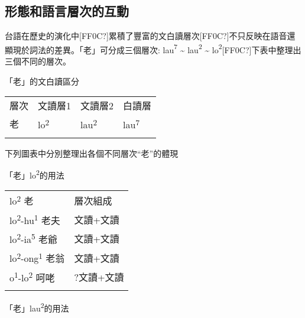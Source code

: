 \subsection{ 形態和語言層次的互動}

\textrm{台語在歷史的演化中[FF0C?]累積了豐富的文白讀層次[FF0C?]不只反映在語音還顯現於詞法的差異。「老」可分成三個層次: lau}\textrm{\textsuperscript{7}} \textrm{{\textasciitilde} lau}\textrm{\textsuperscript{2}} \textrm{{\textasciitilde} lo}\textrm{\textsuperscript{2}}[FF0C?]\textrm{下表中整理出三個不同的層次。}

 \textrm{「老」}的文白讀區分

\tablefirsthead{}

\tabletail{}
\tablelasttail{}
\begin{tabularx}{\textwidth}{XXXX}
\lsptoprule

 層次 & 文讀層1 & 文讀層2 & 白讀層\\
 老 & {\sffamily \textrm{lo}\textrm{\textsuperscript{2}}} & {\sffamily \textrm{lau}\textrm{\textsuperscript{2}}} & {\sffamily \textrm{lau}\textrm{\textsuperscript{7}}}\\
\lspbottomrule
\end{tabularx}
\rmfamily
下列圖表中分別整理出各個不同層次“老”的體現

 \textrm{「老」lo}\textrm{\textsuperscript{2}}的用法

\tablefirsthead{}

\tabletail{}
\tablelasttail{}
\begin{tabularx}{\textwidth}{XX}
\lsptoprule

{\sffamily \textrm{lo}\textrm{\textsuperscript{2}} \textrm{老}} & 層次組成\\
{\sffamily \textrm{lo}\textrm{\textsuperscript{2}}\textrm{{}-hu}\textrm{\textsuperscript{1}} \textrm{老夫}} & 文讀+文讀\\
{\sffamily \textrm{lo}\textrm{\textsuperscript{2}}\textrm{{}-ia}\textrm{\textsuperscript{5}} \textrm{老爺}} & 文讀+文讀\\
{\sffamily \textrm{lo}\textrm{\textsuperscript{2}}\textrm{{}-ong}\textrm{\textsuperscript{1}} \textrm{老翁}} & 文讀+文讀\\
{\sffamily \textrm{o}\textrm{\textsuperscript{1}}\textrm{{}-lo}\textrm{\textsuperscript{2}} \textrm{呵咾} } & ?文讀+文讀\\
\lspbottomrule
\end{tabularx}
 \textrm{「老」lau}\textrm{\textsuperscript{2}}的用法

\tablefirsthead{}

